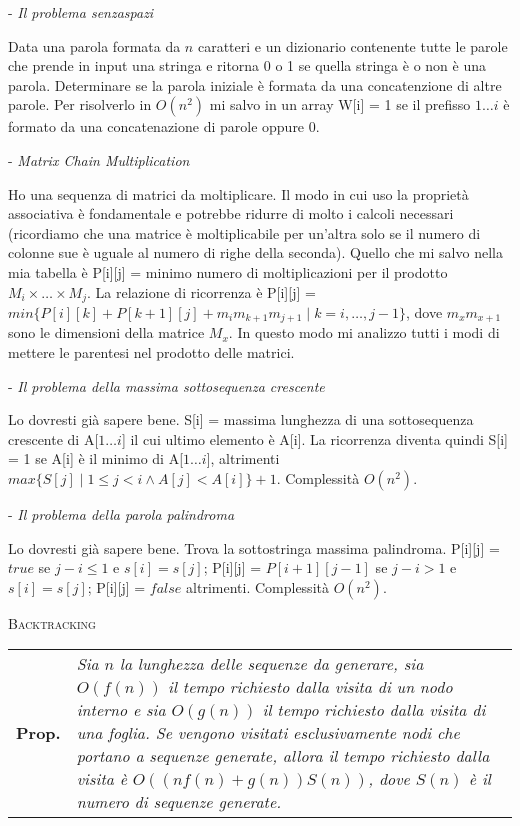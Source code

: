 \documentclass[a4paper,10pt]{article} %
\newcommand{\msection}[1]{%
    {\newpage\bigbreak \bigbreak \par \hfil \huge \textsc {#1}}\par}
\newcommand{\mprop}[1]{%
    {\smallbreak\par\begin{tabular}{ll} \textbf{Prop.} & \begin{minipage}[t]{0.8\columnwidth}\emph  {#1}\end{minipage}\tabularnewline \end{tabular}}\smallskip\par}
\begin{document}
- \emph{ Il problema senzaspazi}\par
Data una parola formata da $n$ caratteri e un dizionario contenente tutte le parole che prende in input una stringa e ritorna 0 o 1 se quella stringa è o non è una parola. Determinare se la parola iniziale è formata da una concatenzione di altre parole. Per risolverlo in $O(n^2)$ mi salvo in un array W[i] = 1 se il prefisso $1 \ldots i$ è formato da una concatenazione di parole oppure 0.
\bigskip

- \emph { Matrix Chain Multiplication }\par
Ho una sequenza di matrici da moltiplicare. Il modo in cui uso la proprietà associativa è fondamentale e potrebbe ridurre di molto i calcoli necessari (ricordiamo che una matrice è moltiplicabile per un'altra solo se il numero di colonne sue è uguale al numero di righe della seconda). Quello che mi salvo nella mia tabella è P[i][j] = minimo numero di moltiplicazioni per il prodotto $M_i \times \ldots \times M_j$. La relazione di ricorrenza è P[i][j] = $min\{P[i][k] + P[k + 1][j] + m_im_{k+1}m_{j+1} \mid k = i,\ldots,j-1\}$, dove $m_xm_{x+1}$ sono le dimensioni della matrice $M_x$. In questo modo mi analizzo tutti i modi di mettere le parentesi nel prodotto delle matrici.
\bigskip

- \emph { Il problema della massima sottosequenza crescente }\par
Lo dovresti già sapere bene. S[i] = massima lunghezza di una sottosequenza crescente di A[$1 \ldots i$] il cui ultimo elemento è A[i]. La ricorrenza diventa quindi S[i] = 1 se A[i] è il minimo di A[$1 \ldots i$], altrimenti $max\{ S[j] \mid 1 \leq j < i \wedge A[j] < A[i] \} + 1$. Complessità $O(n^2)$.
\bigskip

- \emph { Il problema della parola palindroma }\par
Lo dovresti già sapere bene. Trova la sottostringa massima palindroma. P[i][j] = $true$ se $j - i \leq 1$ e $s[i] = s[j]$; P[i][j] = $P[i+1][j - 1]$ se $j - i > 1$ e $s[i] = s[j]$; P[i][j] = $false$ altrimenti. Complessità $O(n^2)$.
\bigskip





\msection{Backtracking}


\bigskip
\mprop{Sia $n$ la lunghezza delle sequenze da generare, sia $O(f(n))$ il tempo richiesto dalla visita di un nodo interno e sia $O(g(n))$ il tempo richiesto dalla visita di una foglia. Se vengono visitati esclusivamente nodi che portano a sequenze generate, allora il tempo richiesto dalla visita è $O((nf(n) + g(n))S(n))$, dove $S(n)$ è il numero di sequenze generate.}
\end{document}
